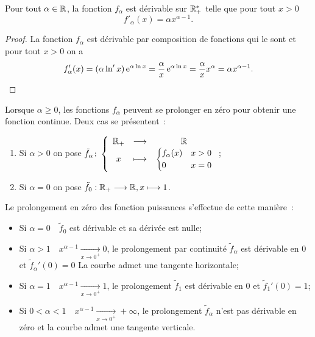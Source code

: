 \begin{prop}
  Pour tout \(\alpha \in \mathbb{R}\), la fonction \(f_\alpha\) est dérivable sur
  \(\mathbb{R}_{+}^{*}\) telle que pour tout \(x>0\)
  \begin{equation}
    f'_{\alpha}{(x)} = \alpha{}x^{\alpha{}-1}.
  \end{equation}
\end{prop}

\begin{proof}
  La fonction \(f_\alpha\) est dérivable par composition de fonctions qui
  le sont et pour tout \(x > 0\) on a
  \begin{equation}
    f_\alpha'(x) = (\alpha \ln' x) \operatorname{e}^{\alpha \ln x} = \frac{\alpha}{x}
    \operatorname{e}^{\alpha \ln x} = \frac{\alpha}{x} x^\alpha = \alpha x^{\alpha-1}.
  \end{equation}
\end{proof}

Lorsque \(\alpha \geqslant 0\), les fonctions \(f_\alpha\) peuvent se
prolonger en zéro pour obtenir une fonction continue. Deux cas se
présentent~:
\begin{enumerate}
  \item Si \(\alpha>0\) on pose
    \(\tilde{f}_\alpha\colon\left\{\begin{array}{ccc}\mathbb{R}_{+} & \longrightarrow &\mathbb{R}\\x & \longmapsto & \begin{cases}
    f_\alpha(x) & x>0 \\ 0 & x = 0 \end{cases}\end{array}\right.\);
  \item Si \(\alpha = 0\) on pose
    \(\tilde{f}_0:\mathbb{R}_{+} \longrightarrow{} \mathbb{R}, x \longmapsto{} 1\).
\end{enumerate}

Le prolongement en zéro des fonction puissances s'effectue de cette
manière~:
\begin{itemize}
  \item Si \(\alpha = 0 \quad \tilde{f}_0\) est dérivable et sa dérivée
    est nulle;
  \item Si \(\alpha>1 \quad x^{\alpha-1}\underset{x \to
    0^+}{\longrightarrow}0\), le prolongement par continuité
    \(\tilde{f}_\alpha\) est dérivable en 0 et \(\tilde{f}_\alpha'(0) =
    0\) La courbe admet une tangente horizontale;
  \item Si \(\alpha = 1 \quad x^{\alpha-1}\underset{x \to
    0^+}{\longrightarrow}1\), le prolongement  \(\tilde{f}_1\) est
    dérivable en 0 et \(\tilde{f}_1'(0) = 1\);
  \item Si \(0<\alpha<1 \quad x^{\alpha-1}\underset{x \to
    0^+}{\longrightarrow}+\infty \), le prolongement \(\tilde{f}_\alpha\)
    n'est pas dérivable en zéro et la courbe admet une tangente
    verticale.
\end{itemize}

